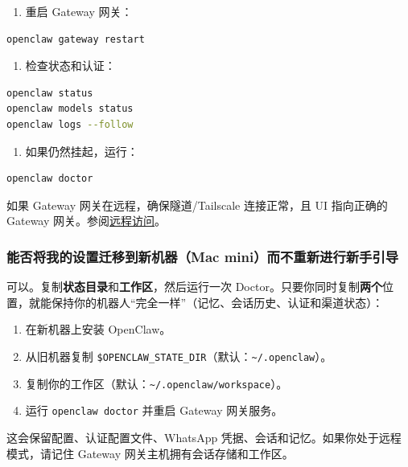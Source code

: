 \begin{enumerate}
  \item 重启 Gateway 网关：
\end{enumerate}


\begin{lstlisting}[language=bash]
openclaw gateway restart
\end{lstlisting}


\begin{enumerate}
  \item 检查状态和认证：
\end{enumerate}


\begin{lstlisting}[language=bash]
openclaw status
openclaw models status
openclaw logs --follow
\end{lstlisting}


\begin{enumerate}
  \item 如果仍然挂起，运行：
\end{enumerate}


\begin{lstlisting}[language=bash]
openclaw doctor
\end{lstlisting}


如果 Gateway 网关在远程，确保隧道/Tailscale 连接正常，且 UI 指向正确的 Gateway 网关。参阅\href{/gateway/remote}{远程访问}。

\subsubsection{能否将我的设置迁移到新机器（Mac mini）而不重新进行新手引导}


可以。复制\textbf{状态目录}和\textbf{工作区}，然后运行一次 Doctor。只要你同时复制\textbf{两个}位置，就能保持你的机器人“完全一样”（记忆、会话历史、认证和渠道状态）：

\begin{enumerate}
  \item 在新机器上安装 OpenClaw。
  \item 从旧机器复制 \texttt{\$OPENCLAW\_STATE\_DIR}（默认：\texttt{\textasciitilde{}/.openclaw}）。
  \item 复制你的工作区（默认：\texttt{\textasciitilde{}/.openclaw/workspace}）。
  \item 运行 \texttt{openclaw doctor} 并重启 Gateway 网关服务。
\end{enumerate}


这会保留配置、认证配置文件、WhatsApp 凭据、会话和记忆。如果你处于远程模式，请记住 Gateway 网关主机拥有会话存储和工作区。

